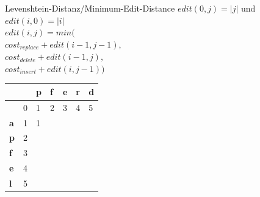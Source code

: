 \documentclass[aspectratio=169]{beamer}
\begin{document}
\begin{frame}[fragile]{Levenshtein-Distanz/Minimum-Edit-Distance}
$edit(0,j)=|j|$ und $edit(i,0)=|i|$\\
$edit(i,j)=min($\\
$cost_{replace} + edit(i-1,j-1),  $\\
$cost_{delete}+ edit(i-1,j),$\\
$cost_{insert}+ edit(i,j-1))  $\\
\begin{table}[]
\begin{tabular}{|l|l|l|l|l|l|l|}
\hline
           & \textbf{} & \textbf{p} & \textbf{f} & \textbf{e} & \textbf{r} & \textbf{d} \\ \hline
\textbf{}  & 0         & 1          & 2          & 3          & 4          & 5          \\ \hline
\textbf{a} & 1         & 1          &            &            &            &            \\ \hline
\textbf{p} & 2         &            &            &            &            &            \\ \hline
\textbf{f} & 3         &            &            &            &            &            \\ \hline
\textbf{e} & 4         &            &            &            &            &            \\ \hline
\textbf{l} & 5         &            &            &            &            &            \\ \hline
\end{tabular}
\end{table}
\end{frame}
\end{document}
